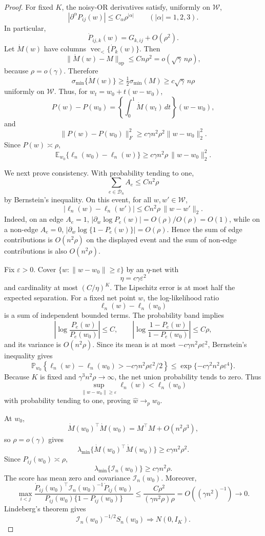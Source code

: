\documentclass[10pt,a4paper]{amsart}
\providecommand{\Eb}{\mathbb E}
\providecommand{\Pb}{\mathbb P}
\providecommand{\calI}{\mathcal I}
\providecommand{\calW}{\mathcal W}
\providecommand{\op}{\operatorname{op}}
\providecommand{\vecl}{\operatorname{vec}_{<}}
\begin{document}
\begin{proof}
For fixed \(K\), the noisy-OR derivatives satisfy, uniformly on
\(\calW\),
\[
  |\partial^\alpha P_{ij}(w)|\le C_\alpha \rho^{|\alpha|}
  \qquad(|\alpha|=1,2,3).
\]
In particular,
\[
  \dot P_{ij,k}(w)=G_{k,ij}+O(\rho^2).
\]
Let \(\dot M(w)\) have columns \(\vecl\{\dot P_k(w)\}\).  Then
\[
  \|\dot M(w)-M\|_{\op}\le Cn\rho^2
  =
  o(\sqrt\gamma\,n\rho),
\]
because \(\rho=o(\gamma)\).  Therefore
\[
  \sigma_{\min}\{\dot M(w)\}
  \ge
  \tfrac12\sigma_{\min}(M)
  \ge
  c\sqrt\gamma\,n\rho
\]
uniformly on \(\calW\).  Thus, for \(w_t=w_0+t(w-w_0)\),
\[
  P(w)-P(w_0)
  =
  \left\{\int_0^1\dot M(w_t)\,dt\right\}(w-w_0),
\]
and
\[
  \|P(w)-P(w_0)\|_F^2
  \ge
  c\gamma n^2\rho^2\|w-w_0\|_2^2 .
\]
Since \(P(w)\asymp\rho\),
\[
  \Eb_{w_0}\{\ell_n(w_0)-\ell_n(w)\}
  \ge
  c\gamma n^2\rho\,\|w-w_0\|_2^2 .
\]

We next prove consistency.  With probability tending to one,
\[
  \sum_{e\in\mathcal D_n}A_e\le Cn^2\rho
\]
by Bernstein's inequality.  On this event, for all \(w,w'\in\calW\),
\[
  |\ell_n(w)-\ell_n(w')|
  \le Cn^2\rho\,\|w-w'\|_2 .
\]
Indeed, on an edge \(A_e=1\),
\(|\partial_w\log P_e(w)|=O(\rho)/O(\rho)=O(1)\), while on a non-edge
\(A_e=0\),
\(|\partial_w\log\{1-P_e(w)\}|=O(\rho)\).  Hence the sum of edge
contributions is \(O(n^2\rho)\) on the displayed event and the sum of
non-edge contributions is also \(O(n^2\rho)\).

Fix \(\varepsilon>0\).  Cover
\(\{w:\|w-w_0\|\ge\varepsilon\}\) by an \(\eta\)-net with
\[
  \eta=c\gamma\varepsilon^2
\]
and cardinality at most \((C/\eta)^K\).  The Lipschitz error is at most
half the expected separation.  For a fixed net point \(w\), the
log-likelihood ratio
\[
  \ell_n(w)-\ell_n(w_0)
\]
is a sum of independent bounded terms.  The probability band implies
\[
  \left|
  \log\frac{P_e(w)}{P_e(w_0)}
  \right|\le C,
  \qquad
  \left|
  \log\frac{1-P_e(w)}{1-P_e(w_0)}
  \right|
  \le C\rho ,
\]
and its variance is \(O(n^2\rho)\).  Since its mean is at most
\(-c\gamma n^2\rho\varepsilon^2\), Bernstein's inequality gives
\[
  \Pb_{w_0}
  \left\{
    \ell_n(w)-\ell_n(w_0)
    >
    -c\gamma n^2\rho\varepsilon^2/2
  \right\}
  \le
  \exp\{-c\gamma^2 n^2\rho\varepsilon^4\}.
\]
Because \(K\) is fixed and \(\gamma^3n^2\rho\to\infty\), the net union
probability tends to zero.  Thus
\[
  \sup_{\|w-w_0\|\ge\varepsilon}\ell_n(w)<\ell_n(w_0)
\]
with probability tending to one, proving \(\widehat w\to_p w_0\).

At \(w_0\),
\[
  \dot M(w_0)^\top\dot M(w_0)
  =
  M^\top M+O(n^2\rho^3),
\]
so \(\rho=o(\gamma)\) gives
\[
  \lambda_{\min}\{\dot M(w_0)^\top\dot M(w_0)\}
  \ge
  c\gamma n^2\rho^2 .
\]
Since \(P_{ij}(w_0)\asymp\rho\),
\[
  \lambda_{\min}\{\calI_n(w_0)\}
  \ge c\gamma n^2\rho .
\]
The score has mean zero and covariance \(\calI_n(w_0)\).  Moreover,
\[
  \max_{i<j}
  \frac{
    \dot P_{ij}(w_0)^\top\calI_n(w_0)^{-1}\dot P_{ij}(w_0)
  }{
    P_{ij}(w_0)\{1-P_{ij}(w_0)\}
  }
  \le
  \frac{C\rho^2}{(\gamma n^2\rho)\rho}
  =
  O((\gamma n^2)^{-1})
  \to0.
\]
Lindeberg's theorem gives
\[
  \calI_n(w_0)^{-1/2}S_n(w_0)\Rightarrow N(0,I_K).
\]


\end{proof}
\end{document}
